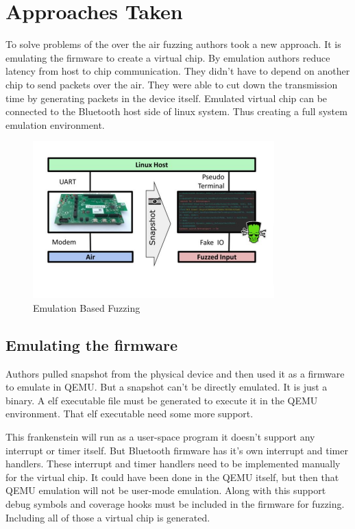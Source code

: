 \documentclass[letterpaper,11pt]{article}
\begin{document}
\section{Approaches Taken}
To solve problems of the over the air fuzzing authors took a new approach. It is emulating the firmware to create a virtual chip. By emulation authors reduce latency from host to chip communication. They didn't have to depend on another chip to send packets over the air. They were able to cut down the transmission time by generating packets in the device itself. Emulated virtual chip can be connected to the Bluetooth host side of linux system. Thus creating a full system emulation environment. 
\begin{figure}[htp]
    \centering
    \includegraphics{images/No-Poc-No-Fix-.png}
    \caption{Emulation Based Fuzzing}
    \label{fig:Emulation Based Fuzzing}
\end{figure}
\subsection{Emulating the firmware}
Authors pulled snapshot from the physical device and then used it as a firmware to emulate in QEMU. But a snapshot can't be directly emulated. It is just a binary. A elf executable file must be generated to execute it in the QEMU environment. That elf executable need some more support. 

This frankenstein will run as a user-space program it doesn't support any interrupt or timer itself. But Bluetooth firmware has it's own interrupt and timer handlers. These interrupt and timer handlers need to be implemented manually for the virtual chip. It could have been done in the QEMU itself, but then that QEMU emulation will not be user-mode emulation. Along with this support debug symbols and coverage hooks must be included in the firmware for fuzzing. Including all of those a virtual chip is generated. 
\end{document}
